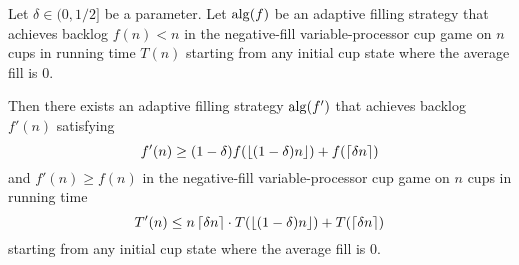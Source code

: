 \begin{lemma}
  \label{lem:adaptiveAmplification}
  Let $\delta\in(0,1/2]$ be a parameter.
  Let $\operatorname{\text{\textup{alg}}}(f)$ be an adaptive filling strategy that 
  achieves backlog $f(n) < n$ in the negative-fill variable-processor cup game
  on $n$ cups in running time $T(n)$ starting from any initial
  cup state where the average fill is $0$.

  Then there exists an adaptive filling strategy $\operatorname{\text{\textup{alg}}}(f')$ that
  achieves backlog $f'(n)$ satisfying 
  $$f'(n) \ge (1-\delta)f(\left\lfloor (1-\delta)n \right\rfloor) + f(\left\lceil \delta n \right\rceil) $$
  and $f'(n) \ge f(n)$
  in the negative-fill variable-processor cup game on $n$ cups in running time 
  $$T'(n) \le n\left\lceil \delta n \right\rceil \cdot T(\left\lfloor (1-\delta)n \right\rfloor) + T(\left\lceil \delta n \right\rceil)$$
  starting from any initial cup state where the average fill is $0$.
\end{lemma}
